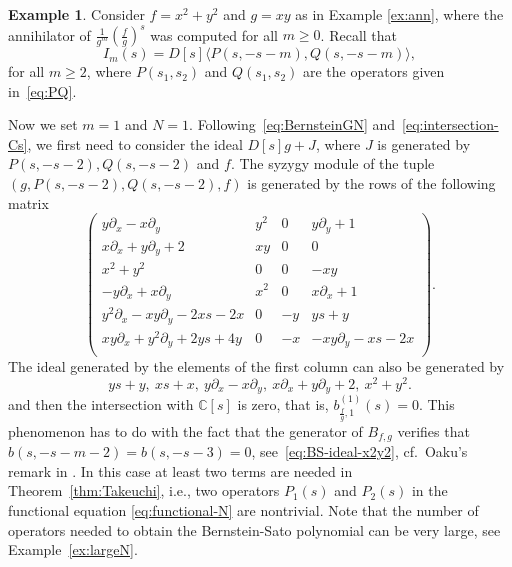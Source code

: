 \documentclass[a4paper,12pt]{amsart}
\theoremstyle{plain}
\theoremstyle{definition}
\newtheorem{ex}[theorem]{Example}
\theoremstyle{remark}
\def\CC{\mathbb{C}}
\begin{document}
\begin{ex}
Consider $f = x^2 + y^2$ and $g = xy$ as in Example \ref{ex:ann}, where the annihilator of $\frac{1}{g^m}\left(\frac{f}{g}\right)^s$
was computed for all $m \geq 0$. Recall that
\[
I_m(s) = D[s] \langle P(s,-s-m), Q(s,-s-m) \rangle,
\]
for all $m \geq 2$, where $P(s_1,s_2)$ and $Q(s_1,s_2)$ are the operators given in~\eqref{eq:PQ}.

Now we set $m=1$ and $N=1$. Following~\eqref{eq:BernsteinGN} and~\eqref{eq:intersection-Cs},
we first need to consider the ideal $D[s]g + J$, where $J$ is generated by $P(s,-s-2),Q(s,-s-2)$ and $f$. The syzygy module of the tuple $(g,P(s,-s-2),Q(s,-s-2),f)$ is generated by the rows of the following matrix
\[
\begin{pmatrix}
y\partial_x-x\partial_y&  y^2&0&       y\partial_y+1 \\        
x\partial_x+y\partial_y+2&xy&0&       0 \\  
x^2+y^2&    0&  0&       -xy \\ 
-y\partial_x+x\partial_y& x^2&0&       x\partial_x+1 \\
y^2 \partial_x-xy\partial_y-2xs-2x &     0&  -y&      ys+y \\
xy\partial_x+y^2\partial_y+2ys+4y &     0&  -x&      -xy\partial_y-xs-2x \\
\end{pmatrix}.
\]
The ideal generated by the elements of the first column can also be generated by
\[
 ys+y, \
 xs+x, \
 y\partial_x-x\partial_y, \
 x\partial_x+y\partial_y+2, \
 x^2+y^2.
\]
and then the intersection with $\CC[s]$ is zero, that is, $b_{\frac{f}{g},1}^{(1)}(s) = 0$.
This phenomenon has to do with the fact that the generator of $B_{f,g}$
verifies that $b(s,-s-m-2) = b(s,-s-3) = 0$, see~\eqref{eq:BS-ideal-x2y2},
cf.~Oaku's remark in \cite[p.~717]{Tak23}. In this case at least two terms are needed in Theorem~\ref{thm:Takeuchi}, i.e.,
two operators $P_1(s)$ and $P_2(s)$ in the functional equation \eqref{eq:functional-N} are nontrivial.
Note that the number of operators needed to obtain the Bernstein-Sato polynomial can be very large,
see Example~\ref{ex:largeN}.


\end{ex}
\end{document}
